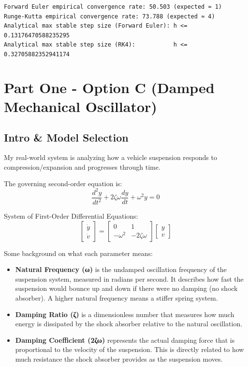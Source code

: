 \documentclass[11pt]{article}
\begin{document}
    \begin{Verbatim}[commandchars=\\\{\}]
Forward Euler empirical convergence rate: 50.503 (expected ≈ 1)
Runge-Kutta empirical convergence rate: 73.788 (expected ≈ 4)
Analytical max stable step size (Forward Euler): h <= 0.13176470588235295
Analytical max stable step size (RK4):           h <= 0.32705882352941174
    \end{Verbatim}

    \section{Part One - Option C (Damped Mechanical
Oscillator)}\label{part-one---option-c-damped-mechanical-oscillator}

\subsection{Intro \& Model Selection}\label{intro-model-selection}

My real-world system is analyzing how a vehicle suspension responds to
compression/expansion and progresses through time.

The governing second-order equation is:
\[\frac{d^2 y}{dt^2} + 2\zeta\omega\frac{dy}{dt} + \omega^2 y = 0\]

System of First-Order Differential Equations: \[
\begin{bmatrix}
\dot{y}\\
\dot{v}
\end{bmatrix}
=
\begin{bmatrix}
0 & 1\\
-\omega^{2} & -2\zeta\omega
\end{bmatrix}
\begin{bmatrix}
y\\
v
\end{bmatrix}
\]

Some background on what each parameter means:

\begin{itemize}
\item
  \textbf{Natural Frequency (ω)} is the undamped oscillation frequency
  of the suspension system, measured in radians per second. It describes
  how fast the suspension would bounce up and down if there were no
  damping (no shock absorber). A higher natural frequency means a
  stiffer spring system.
\item
  \textbf{Damping Ratio (ζ)} is a dimensionless number that measures how
  much energy is dissipated by the shock absorber relative to the
  natural oscillation.
\item
  \textbf{Damping Coefficient (2ζω)} represents the actual damping force
  that is proportional to the velocity of the suspension. This is
  directly related to how much resistance the shock absorber provides as
  the suspension moves.
\end{itemize}
\end{document}
